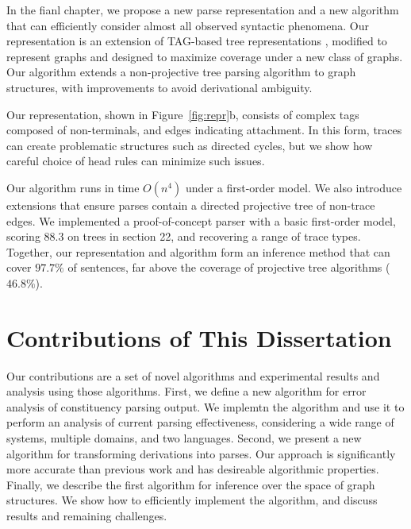 In the fianl chapter, we propose a new parse representation and a new algorithm that can efficiently consider almost all observed syntactic phenomena.
Our representation is an extension of TAG-based tree representations \parencite{cck,Shen:2007}, modified to represent graphs and designed to maximize coverage under a new class of graphs.
Our algorithm extends a non-projective tree parsing algorithm \parencite{ec} to graph structures, with improvements to avoid derivational ambiguity.

Our representation, shown in Figure~\ref{fig:repr}b, consists of complex tags composed of non-terminals, and edges indicating attachment.
In this form, traces can create problematic structures such as directed cycles, but we show how careful choice of head rules can minimize such issues.

Our algorithm runs in time $O(n^4)$ under a first-order model.
We also introduce extensions that ensure parses contain a directed projective tree of non-trace edges.
We implemented a proof-of-concept parser with a basic first-order model, scoring $88.3$ on trees in section 22, and recovering a range of trace types.
Together, our representation and algorithm form an inference method that can cover $97.7\%$ of sentences, far above the coverage of projective tree algorithms ($46.8\%$).

\section{Contributions of This Dissertation}

Our contributions are a set of novel algorithms and experimental results and analysis using those algorithms.
First, we define a new algorithm for error analysis of constituency parsing output.
We implemtn the algorithm and use it to perform an analysis of current parsing effectiveness, considering a wide range of systems, multiple domains, and two languages.
Second, we present a new algorithm for transforming \ccg derivations into \gb parses.
Our approach is significantly more accurate than previous work and has desireable algorithmic properties.
Finally, we describe the first algorithm for inference over the space of \gb graph structures.
We show how to efficiently implement the algorithm, and discuss results and remaining challenges.

